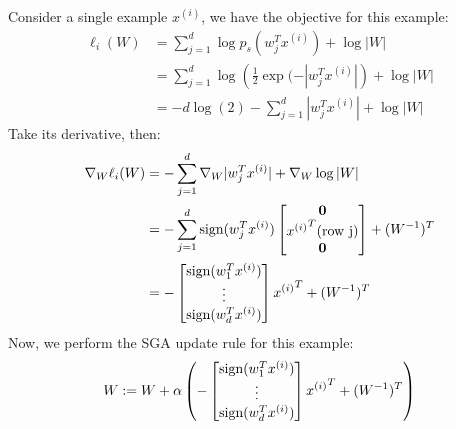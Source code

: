 \begin{answer}
Consider a single example $x^{(i)}$, we have the objective for this example:
\begin{align}
	\ell_i(W) &= \sum_{j=1}^{d} \log p_s(w_j^T x^{(i)}) + \log|W| \\
	&= \sum_{j=1}^{d} \log\left(\frac{1}{2}\exp(-|w_j^T x^{(i)}|\right) + \log|W| \\
	&= -d\log(2) - \sum_{j=1}^{d}|w_j^T x^{(i)}| + \log|W|
\end{align}
Take its derivative, then:
\begin{align}
	\nabla_W\ell_i(W) &= -\sum_{j=1}^{d}\nabla_W|w_j^T x^{(i)}| + \nabla_W\log|W| \\
	&= -\sum_{j=1}^{d}\text{sign}(w_j^T x^{(i)}) 
	\begin{bmatrix}
		\textbf{0} \\
		{x^{(i)}}^T\text{(row j)} \\
		\textbf{0} \\ 
	\end{bmatrix} 
	+ (W^{-1})^T \\
	&=
	-\begin{bmatrix}
		\text{sign}(w_1^T x^{(i)}) \\
		\vdots \\
		\text{sign}(w_d^T x^{(i)}) \\
	\end{bmatrix}{x^{(i)}}^T + (W^{-1})^T	
\end{align}
Now, we perform the SGA update rule for this example: 
$$W := W + \alpha\left( 
-\begin{bmatrix}
	\text{sign}(w_1^T x^{(i)}) \\
	\vdots \\
	\text{sign}(w_d^T x^{(i)}) \\
\end{bmatrix}{x^{(i)}}^T + (W^{-1})^T \right)$$
\end{answer}
